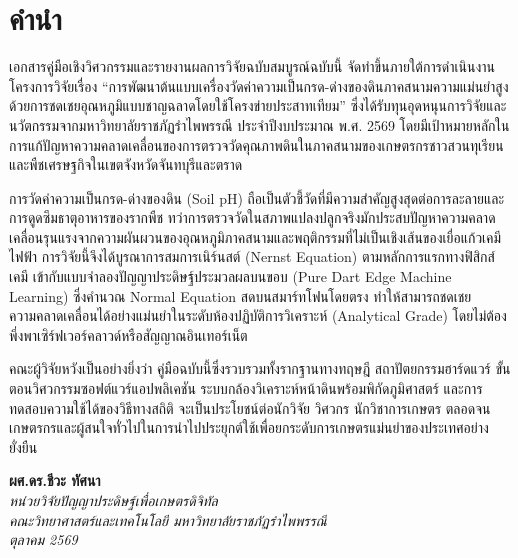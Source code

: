 \chapter*{คำนำ}

เอกสารคู่มือเชิงวิศวกรรมและรายงานผลการวิจัยฉบับสมบูรณ์ฉบับนี้ จัดทำขึ้นภายใต้การดำเนินงานโครงการวิจัยเรื่อง ``การพัฒนาต้นแบบเครื่องวัดค่าความเป็นกรด-ด่างของดินภาคสนามความแม่นยำสูงด้วยการชดเชยอุณหภูมิแบบชาญฉลาดโดยใช้โครงข่ายประสาทเทียม'' ซึ่งได้รับทุนอุดหนุนการวิจัยและนวัตกรรมจากมหาวิทยาลัยราชภัฏรำไพพรรณี ประจำปีงบประมาณ พ.ศ. 2569 โดยมีเป้าหมายหลักในการแก้ปัญหาความคลาดเคลื่อนของการตรวจวัดคุณภาพดินในภาคสนามของเกษตรกรชาวสวนทุเรียนและพืชเศรษฐกิจในเขตจังหวัดจันทบุรีและตราด

การวัดค่าความเป็นกรด-ด่างของดิน (Soil pH) ถือเป็นตัวชี้วัดที่มีความสำคัญสูงสุดต่อการละลายและการดูดซึมธาตุอาหารของรากพืช ทว่าการตรวจวัดในสภาพแปลงปลูกจริงมักประสบปัญหาความคลาดเคลื่อนรุนแรงจากความผันผวนของอุณหภูมิภาคสนามและพฤติกรรมที่ไม่เป็นเชิงเส้นของเยื่อแก้วเคมีไฟฟ้า การวิจัยนี้จึงได้บูรณาการสมการเนิร์นสต์ (Nernst Equation) ตามหลักการแรกทางฟิสิกส์เคมี เข้ากับแบบจำลองปัญญาประดิษฐ์ประมวลผลบนขอบ (Pure Dart Edge Machine Learning) ซึ่งคำนวณ Normal Equation สดบนสมาร์ทโฟนโดยตรง ทำให้สามารถชดเชยความคลาดเคลื่อนได้อย่างแม่นยำในระดับห้องปฏิบัติการวิเคราะห์ (Analytical Grade) โดยไม่ต้องพึ่งพาเซิร์ฟเวอร์คลาวด์หรือสัญญาณอินเทอร์เน็ต

คณะผู้วิจัยหวังเป็นอย่างยิ่งว่า คู่มือฉบับนี้ซึ่งรวบรวมทั้งรากฐานทางทฤษฎี สถาปัตยกรรมฮาร์ดแวร์ ขั้นตอนวิศวกรรมซอฟต์แวร์แอปพลิเคชัน ระบบกล้องวิเคราะห์หน้าดินพร้อมพิกัดภูมิศาสตร์ และการทดสอบความใช้ได้ของวิธีทางสถิติ จะเป็นประโยชน์ต่อนักวิจัย วิศวกร นักวิชาการเกษตร ตลอดจนเกษตรกรและผู้สนใจทั่วไปในการนำไปประยุกต์ใช้เพื่อยกระดับการเกษตรแม่นยำของประเทศอย่างยั่งยืน

\vspace{1.5cm}
\begin{flushright}
    \textbf{ผศ.ดร.ชีวะ ทัศนา}\\
    \textit{หน่วยวิจัยปัญญาประดิษฐ์เพื่อเกษตรดิจิทัล}\\
    \textit{คณะวิทยาศาสตร์และเทคโนโลยี มหาวิทยาลัยราชภัฏรำไพพรรณี}\\
    \textit{ตุลาคม 2569}
\end{flushright}
\clearpage
